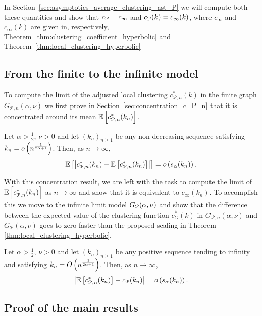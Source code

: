 In Section~\ref{sec:asymptotics_average_clustering_ast_P} we will compute both these quantities and show that $c_{{\mathcal P}} = c_\infty$ and $c_{{\mathcal P}}(k) = c_\infty(k)$, where $c_\infty$ and $c_\infty(k)$ are given in, respectively, Theorem~\ref{thm:clustering_coefficient_hyperbolic} and Theorem~\ref{thm:local_clustering_hyperbolic}

\subsection{From the finite to the infinite model}

To compute the limit of the adjusted local clustering $c_{\mathcal{P},n}^\ast(k)$ in the finite graph $G_{\mathcal{P},n}(\alpha, \nu)$ we first prove in Section~\ref{sec:concentration_c_P_n} that it is concentrated around its mean $\mathbb{E}\left[c_{\mathcal{P},n}^\ast(k_n)\right]$.

\begin{proposition}\label{prop:concentration_local_clustering_P_n}
Let $\alpha > \frac{1}{2}$, $\nu > 0$ and let $(k_n)_{n \ge 1}$ be any non-decreasing sequence satisfying $k_n = o\left(n^{\frac{1}{2\alpha+1}}\right)$. Then, as $n \to \infty$,
\[
	\mathbb{E}\left[\left|c_{\mathcal{P},n}^\ast(k_n) - \mathbb{E}\left[c_{\mathcal{P},n}^\ast(k_n)\right]\right|\right] = o\left(s_\alpha(k_n)\right).
\]
\end{proposition}

With this concentration result, we are left with the task to compute the limit of $\mathbb{E}\left[c_{\mathcal{P},n}^\ast(k_n)\right]$ as $n \to \infty$ and show that it is equivalent to $c_\infty(k_n)$. To accomplish this we move to the infinite limit model $G_{{\mathcal P}}(\alpha,\nu)$ and show that the difference between the expected value of the clustering function $c_G^\ast(k)$ in $G_{\mathcal{P},n}(\alpha,\nu)$ and $G_{\mathcal{P}}(\alpha,\nu)$ goes to zero faster than the proposed scaling in Theorem \ref{thm:local_clustering_hyperbolic}.


\begin{proposition}\label{prop:convergence_average_clustering_P_n}
Let $\alpha > \frac{1}{2}$, $\nu > 0$ and let $(k_n)_{n \ge 1}$ be any positive sequence tending to infinity and satisfying $k_n = O\left(n^{\frac{1}{2\alpha+1}}\right)$. Then, as $n \to \infty$,
\[
	\left|\mathbb{E}\left[c_{{\mathcal P},n}^\ast(k_n)\right] - c_{{\mathcal P}}(k_n)\right| = o\left(s_\alpha(k_n)\right).
\]
\end{proposition}


\subsection{Proof of the main results}\label{ssec:proof_main_results}

